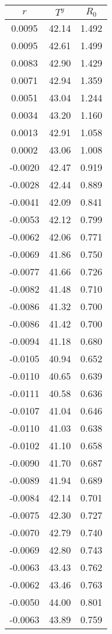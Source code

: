 \begin{tabular}{ccc}
  \hline
$r$ & $T^y$ & $R_0$ \\ 
  \hline
0.0095 & 42.14 & 1.492 \\ 
  0.0095 & 42.61 & 1.499 \\ 
  0.0083 & 42.90 & 1.429 \\ 
  0.0071 & 42.94 & 1.359 \\ 
  0.0051 & 43.04 & 1.244 \\ 
  0.0034 & 43.20 & 1.160 \\ 
  0.0013 & 42.91 & 1.058 \\ 
  0.0002 & 43.06 & 1.008 \\ 
  -0.0020 & 42.47 & 0.919 \\ 
  -0.0028 & 42.44 & 0.889 \\ 
  -0.0041 & 42.09 & 0.841 \\ 
  -0.0053 & 42.12 & 0.799 \\ 
  -0.0062 & 42.06 & 0.771 \\ 
  -0.0069 & 41.86 & 0.750 \\ 
  -0.0077 & 41.66 & 0.726 \\ 
  -0.0082 & 41.48 & 0.710 \\ 
  -0.0086 & 41.32 & 0.700 \\ 
  -0.0086 & 41.42 & 0.700 \\ 
  -0.0094 & 41.18 & 0.680 \\ 
  -0.0105 & 40.94 & 0.652 \\ 
  -0.0110 & 40.65 & 0.639 \\ 
  -0.0111 & 40.58 & 0.636 \\ 
  -0.0107 & 41.04 & 0.646 \\ 
  -0.0110 & 41.03 & 0.638 \\ 
  -0.0102 & 41.10 & 0.658 \\ 
  -0.0090 & 41.70 & 0.687 \\ 
  -0.0089 & 41.94 & 0.689 \\ 
  -0.0084 & 42.14 & 0.701 \\ 
  -0.0075 & 42.30 & 0.727 \\ 
  -0.0070 & 42.79 & 0.740 \\ 
  -0.0069 & 42.80 & 0.743 \\ 
  -0.0063 & 43.43 & 0.762 \\ 
  -0.0062 & 43.46 & 0.763 \\ 
  -0.0050 & 44.00 & 0.801 \\ 
  -0.0063 & 43.89 & 0.759 \\ 
   \hline
\end{tabular}
